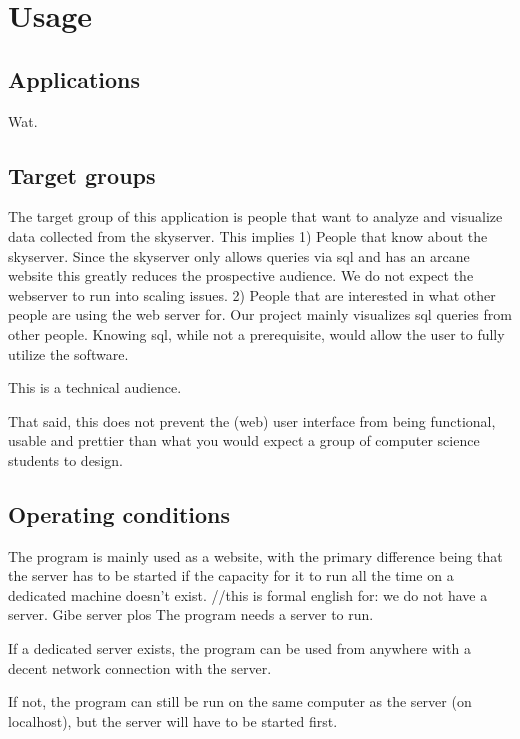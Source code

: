 \section{Usage}

\subsection{Applications}
Wat.

\subsection{Target groups}

The target group of this application is people that want to analyze and visualize data collected from the skyserver.
 This implies
 1) People that know about the skyserver.
Since the skyserver only allows queries via sql and has an arcane website this greatly reduces the prospective audience. We do not expect the webserver to run into scaling issues.
 2) People that are interested in what other people are using the web server for. 
Our project mainly visualizes sql queries from other people. Knowing sql, while not a prerequisite, would allow the user to fully utilize the software.

This is a technical audience.

That said, this does not prevent the (web) user interface from being functional, usable and prettier than what you would expect a group of computer science students to design.
 

\subsection{Operating conditions}

The program is mainly used as a website, with the primary difference being that the server has to be started if the capacity for it to run all the time on a dedicated machine doesn't exist. //this is formal english for: we do not have a server. Gibe server plos
The program needs a server to run. 

If a dedicated server exists, the program can be used from anywhere with a decent network connection with the server.

If not, the program can still be run on the same computer as the server (on localhost), but the server will have to be started first.
 

